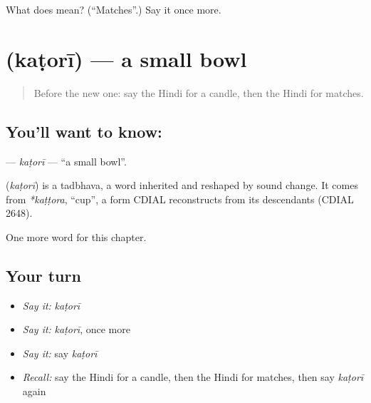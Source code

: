 \begin{tcolorbox}[breakable,colback=teal!4,colframe=teal!35!black,title={Before you move on}]
What does  mean? (\textquotedblleft{}Matches\textquotedblright{}.) Say it once more.
\end{tcolorbox}
\section[\texorpdfstring{\hi{कटोरी} (kaṭorī)}{कटोरी (kaṭorī)}]{ (kaṭorī) — a small bowl}

\label{lesson:HI-C132-katori}



\begin{quote}
Before the new one: say the Hindi for a candle, then the Hindi for matches.
\end{quote}

\subsection*{You'll want to know: }
\textbf{} — \emph{kaṭorī} — \textquotedblleft{}a small bowl\textquotedblright{}.

\begin{cousinweb}
\textbf{} (\emph{kaṭorī}) is a tadbhava, a word inherited and reshaped by sound change. It comes from \emph{*kaṭṭora}, \textquotedblleft{}cup\textquotedblright{}, a form CDIAL reconstructs from its descendants (CDIAL 2648).
\end{cousinweb}

\begin{grammarlens}[title={What you've built}]
One more word for this chapter.
\end{grammarlens}

\subsection*{Your turn}
\begin{itemize}
\raggedright
  \item \emph{Say it:} \emph{kaṭorī}
  \item \emph{Say it:} \emph{kaṭorī}, once more
  \item \emph{Say it:} say \emph{kaṭorī}
  \item \emph{Recall:} say the Hindi for a candle, then the Hindi for matches, then say \emph{kaṭorī} again
\end{itemize}

